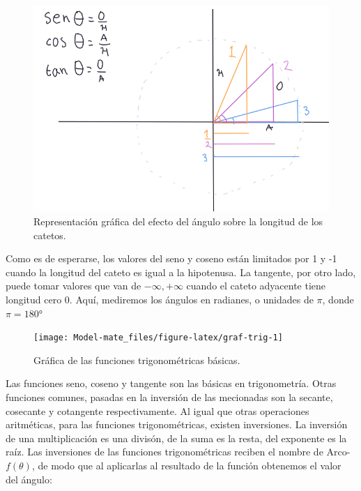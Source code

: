 \documentclass[
]{book}
\begin{document}
\begin{figure}

{\centering \includegraphics[width=9.53in]{Unidad-I/Func-trigo} 

}

\caption{Representación gráfica del efecto del ángulo sobre la longitud de los catetos.}\label{fig:catetos}
\end{figure}

Como es de esperarse, los valores del seno y coseno están limitados por 1 y -1 cuando la longitud del cateto es igual a la hipotenusa. La tangente, por otro lado, puede tomar valores que van de \(-\infty, +\infty\) cuando el cateto adyacente tiene longitud cero \(0\). Aquí, mediremos los ángulos en radianes, o unidades de \(\pi\), donde \(\pi = 180°\)

\begin{figure}

{\centering \texttt{[image: Model-mate\_files/figure-latex/graf-trig-1]} 

}

\caption{Gráfica de las funciones trigonométricas básicas.}\label{fig:graf-trig}
\end{figure}

Las funciones seno, coseno y tangente son las básicas en trigonometría. Otras funciones comunes, pasadas en la inversión de las mecionadas son la secante, cosecante y cotangente respectivamente. Al igual que otras operaciones aritméticas, para las funciones trigonométricas, existen inversiones. La inversión de una multiplicación es una divisón, de la suma es la resta, del exponente es la raíz. Las inversiones de las funciones trigonométricas reciben el nombre de Arco-\(f(\theta)\), de modo que al aplicarlas al resultado de la función obtenemos el valor del ángulo:
\end{document}
